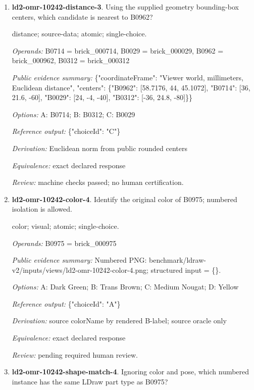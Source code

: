 \begin{enumerate}
\item \textbf{ld2-omr-10242-distance-3}. Using the supplied geometry bounding-box centers, which candidate is nearest to B0962?
\par{\small distance; source-data; atomic; single-choice.\par\textit{Operands:} B0714 = brick\_000714, B0029 = brick\_000029, B0962 = brick\_000962, B0312 = brick\_000312\par\textit{Public evidence summary:} \{"coordinateFrame": "Viewer world, millimeters, Euclidean distance", "centers": \{"B0962": [58.7176, 44, 45.1072], "B0714": [36, 21.6, -60], "B0029": [24, -4, -40], "B0312": [-36, 24.8, -80]\}\}\par\textit{Options:} A: B0714; B: B0312; C: B0029\par\textit{Reference output:} \{"choiceId": "C"\}\par\textit{Derivation:} Euclidean norm from public rounded centers\par\textit{Equivalence:} exact declared response\par\textit{Review:} machine checks passed; no human certification.}
\item \textbf{ld2-omr-10242-color-4}. Identify the original color of B0975; numbered isolation is allowed.
\par{\small color; visual; atomic; single-choice.\par\textit{Operands:} B0975 = brick\_000975\par\textit{Public evidence summary:} Numbered PNG: benchmark/ldraw-v2/inputs/views/ld2-omr-10242-color-4.png; structured input = \{\}.\par\textit{Options:} A: Dark Green; B: Trans Brown; C: Medium Nougat; D: Yellow\par\textit{Reference output:} \{"choiceId": "A"\}\par\textit{Derivation:} source colorName by rendered B-label; source oracle only\par\textit{Equivalence:} exact declared response\par\textit{Review:} pending required human review.}
\item \textbf{ld2-omr-10242-shape-match-4}. Ignoring color and pose, which numbered instance has the same LDraw part type as B0975?

\end{enumerate}
